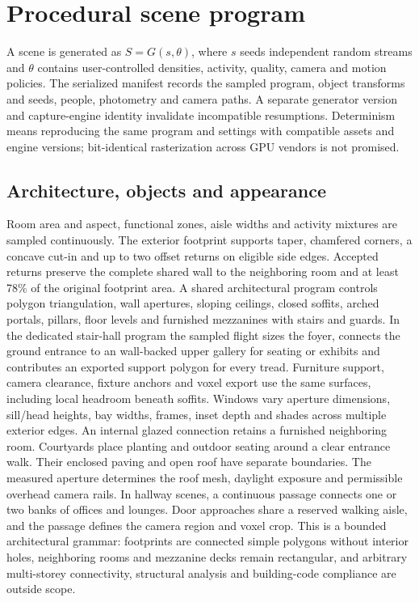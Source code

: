\documentclass{article}
\begin{document}
\section{Procedural scene program}
A scene is generated as $S=G(s,\theta)$, where $s$ seeds independent random streams and $\theta$ contains user-controlled densities, activity, quality, camera and motion policies. The serialized manifest records the sampled program, object transforms and seeds, people, photometry and camera paths. A separate generator version and capture-engine identity invalidate incompatible resumptions. Determinism means reproducing the same program and settings with compatible assets and engine versions; bit-identical rasterization across GPU vendors is not promised.

\subsection{Architecture, objects and appearance}
Room area and aspect, functional zones, aisle widths and activity mixtures are sampled continuously. The exterior footprint supports taper, chamfered corners, a concave cut-in and up to two offset returns on eligible side edges. Accepted returns preserve the complete shared wall to the neighboring room and at least 78\% of the original footprint area. A shared architectural program controls polygon triangulation, wall apertures, sloping ceilings, closed soffits, arched portals, pillars, floor levels and furnished mezzanines with stairs and guards. In the dedicated stair-hall program the sampled flight sizes the foyer, connects the ground entrance to an wall-backed upper gallery for seating or exhibits and contributes an exported support polygon for every tread. Furniture support, camera clearance, fixture anchors and voxel export use the same surfaces, including local headroom beneath soffits. Windows vary aperture dimensions, sill/head heights, bay widths, frames, inset depth and shades across multiple exterior edges. An internal glazed connection retains a furnished neighboring room. Courtyards place planting and outdoor seating around a clear entrance walk. Their enclosed paving and open roof have separate boundaries. The measured aperture determines the roof mesh, daylight exposure and permissible overhead camera rails. In hallway scenes, a continuous passage connects one or two banks of offices and lounges. Door approaches share a reserved walking aisle, and the passage defines the camera region and voxel crop. This is a bounded architectural grammar: footprints are connected simple polygons without interior holes, neighboring rooms and mezzanine decks remain rectangular, and arbitrary multi-storey connectivity, structural analysis and building-code compliance are outside scope.
\end{document}
